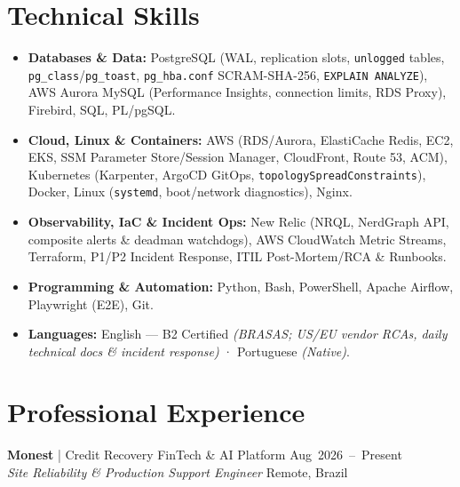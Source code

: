 \documentclass[10pt,a4paper]{article}
\begin{document}
\section{Technical Skills}
\begin{itemize}
    \item \textbf{Databases \& Data:} PostgreSQL (WAL, replication slots, \texttt{unlogged} tables, \texttt{pg\_class}/\texttt{pg\_toast}, \mbox{\texttt{pg\_hba.conf}} \mbox{SCRAM-SHA-256}, \mbox{\texttt{EXPLAIN ANALYZE}}), AWS Aurora MySQL (Performance Insights, connection limits, RDS Proxy), Firebird, SQL, PL/pgSQL.
    \item \textbf{Cloud, Linux \& Containers:} AWS (RDS/Aurora, ElastiCache Redis, EC2, EKS, SSM Parameter Store/Session Manager, CloudFront, Route 53, ACM), Kubernetes (Karpenter, ArgoCD GitOps, \mbox{\texttt{topologySpreadConstraints}}), Docker, Linux (\texttt{systemd}, boot/network diagnostics), Nginx.
    \item \textbf{Observability, IaC \& Incident Ops:} New Relic (NRQL, NerdGraph API, composite alerts \& deadman watchdogs), AWS CloudWatch Metric Streams, Terraform, \mbox{P1/P2} Incident Response, ITIL \mbox{Post-Mortem/RCA} \& Runbooks.
    \item \textbf{Programming \& Automation:} Python, Bash, PowerShell, Apache Airflow, Playwright (E2E), Git.
    \item \textbf{Languages:} English --- B2 Certified \textit{(BRASAS; US/EU vendor RCAs, daily technical docs \& incident response)} · Portuguese \textit{(Native)}.
\end{itemize}

\section{Professional Experience}

\textbf{Monest} | Credit Recovery FinTech \& AI Platform \hfill \mbox{Aug 2026 -- Present} \\
\textit{Site Reliability \& Production Support Engineer} \hfill Remote, Brazil
\end{document}
